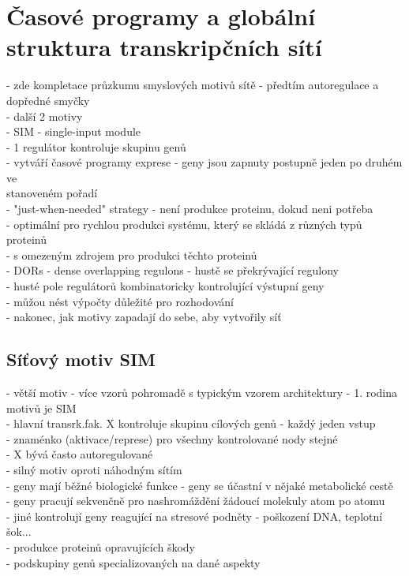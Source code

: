 \documentclass[11pt,a4paper]{report}
\begin{document}
\chapter{Časové programy a globální struktura transkripčních sítí}
- zde kompletace průzkumu smyslových motivů sítě - předtím autoregulace a dopředné smyčky\\
- další 2 motivy\\
\indent - SIM - single-input module\\
\indent \indent - 1 regulátor kontroluje skupinu genů\\
\indent \indent - vytváří časové programy exprese - geny jsou zapnuty postupně jeden po druhém ve\\
\indent \indent \indent stanoveném pořadí\\
\indent \indent - "just-when-needed" strategy - není produkce proteinu, dokud neni potřeba\\
\indent \indent - optimální pro rychlou produkci systému, který se skládá z různých typů proteinů\\
\indent \indent \indent - s omezeným zdrojem pro produkci těchto proteinů\\
\indent - DORs - dense overlapping regulons - hustě se překrývající regulony\\
\indent \indent - husté pole regulátorů kombinatoricky kontrolující výstupní geny\\
\indent \indent - můžou nést výpočty důležité pro rozhodování \\
- nakonec, jak motivy zapadají do sebe, aby vytvořily síť

\section{Síťový motiv SIM}
- větší motiv - více vzorů pohromadě s typickým vzorem architektury - 1. rodina motivů je SIM\\
- hlavní transrk.fak. X kontroluje skupinu cílových genů - každý jeden vstup\\
\indent - znaménko (aktivace/represe) pro všechny kontrolované nody stejné\\
- X bývá často autoregulované\\
- silný motiv oproti náhodným sítím\\
- geny mají běžné biologické funkce - geny se účastní v nějaké metabolické cestě\\
- geny pracují sekvenčně pro nashromáždění žádoucí molekuly atom po atomu\\
- jiné  kontrolují geny reagující na stresové podněty - poškození DNA, teplotní šok...\\
\indent - produkce proteinů opravujících škody\\
\indent - podskupiny genů specializovaných na dané aspekty\\
\end{document}
